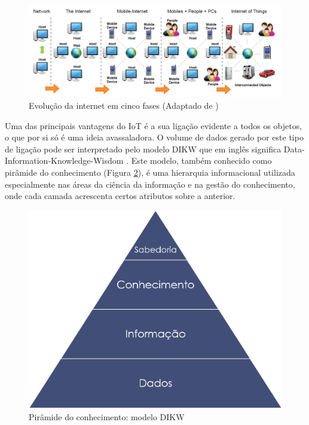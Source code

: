 \begin{figure}[!htb]
	\centering
	\includegraphics[scale=0.5]{img/cap3-iot/diagrama-evolution.png}
	\caption{Evolução da internet em cinco fases (Adaptado de \cite{Our2013})}
	\label{iotEvolution}
\end{figure}



Uma das principais vantagens do IoT é a sua ligação evidente a todos os objetos, o que por si só é uma ideia avassaladora. O volume de dados gerado por este tipo de ligação pode ser interpretado pelo modelo DIKW que em inglês significa Data-Information-Knowledge-Wisdom \cite{Rowley2007}. Este modelo, também conhecido como pirâmide do conhecimento (Figura \ref{dikw}), é uma hierarquia informacional utilizada especialmente nas áreas da ciência da informação e na gestão do conhecimento, onde cada camada acrescenta certos atributos sobre a anterior.


\begin{figure}[!htb]
	\centering
	\includegraphics[scale=0.3]{img/cap3-iot/dikw.png}
	\caption{Pirâmide do conhecimento: modelo DIKW}
	\label{dikw}
\end{figure}



